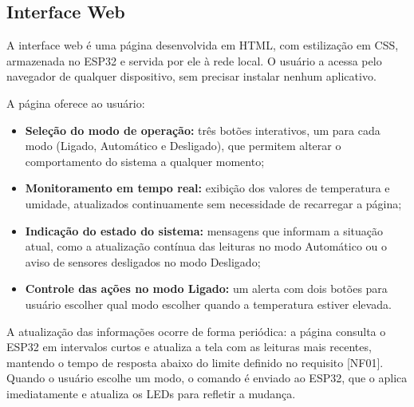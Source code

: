 \subsection{Interface Web}

A interface web é uma página desenvolvida em HTML, com estilização em CSS, armazenada no ESP32 e servida por ele à rede local. O usuário a acessa pelo navegador de qualquer dispositivo, sem precisar instalar nenhum aplicativo.

A página oferece ao usuário:

\begin{itemize}
    \item \textbf{Seleção do modo de operação:} três botões interativos, um para cada modo (Ligado, Automático e Desligado), que permitem alterar o comportamento do sistema a qualquer momento;
    \item \textbf{Monitoramento em tempo real:} exibição dos valores de temperatura e umidade, atualizados continuamente sem necessidade de recarregar a página;
    \item \textbf{Indicação do estado do sistema:} mensagens que informam a situação atual, como a atualização contínua das leituras no modo Automático ou o aviso de sensores desligados no modo Desligado;
    \item \textbf{Controle das ações no modo Ligado:} um alerta com dois botões para usuário escolher qual modo escolher quando a temperatura estiver elevada.
\end{itemize}

A atualização das informações ocorre de forma periódica: a página consulta o ESP32 em intervalos curtos e atualiza a tela com as leituras mais recentes, mantendo o tempo de resposta abaixo do limite definido no requisito [NF01]. Quando o usuário escolhe um modo, o comando é enviado ao ESP32, que o aplica imediatamente e atualiza os LEDs para refletir a mudança.